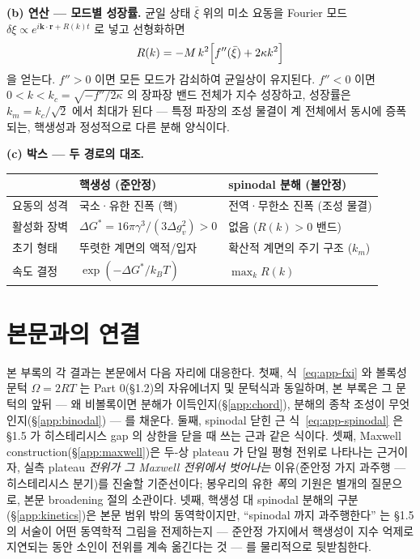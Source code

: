 \documentclass[11pt,a4paper]{article}
\begin{document}
\textbf{(b) 연산 --- 모드별 성장률.} 균일 상태 $\bar\xi$ 위의 미소 요동을 Fourier 모드
$\delta\xi\propto e^{i\mathbf{k}\cdot\mathbf{r}+R(k)t}$ 로 넣고 선형화하면
\begin{equation}
R(k)=-M\,k^2\Bigl[f''(\bar\xi)+2\kappa k^2\Bigr]
\label{eq:app-ch-R}
\end{equation}
을 얻는다. $f''>0$ 이면 모든 모드가 감쇠하여 균일상이 유지된다. $f''<0$ 이면
$0<k<k_c=\sqrt{-f''/2\kappa}$ 의 장파장 밴드 전체가 지수 성장하고, 성장률은
$k_m=k_c/\sqrt2$ 에서 최대가 된다 --- 특정 파장의 조성 물결이 계 전체에서 동시에 증폭되는, 핵생성과
정성적으로 다른 분해 양식이다.

\textbf{(c) 박스 --- 두 경로의 대조.}
\begin{center}
\begin{tabular}{@{}lll@{}}
\toprule
 & 핵생성 (준안정) & spinodal 분해 (불안정) \\
\midrule
요동의 성격 & 국소·유한 진폭 (핵) & 전역·무한소 진폭 (조성 물결) \\
활성화 장벽 & $\Delta G^\ast=16\pi\gamma^3/(3\Delta g_v^2)>0$ & 없음 ($R(k)>0$ 밴드) \\
초기 형태 & 뚜렷한 계면의 액적/입자 & 확산적 계면의 주기 구조 ($k_m$) \\
속도 결정 & $\exp(-\Delta G^\ast/k_BT)$ & $\max_k R(k)$ \\
\bottomrule
\end{tabular}
\end{center}

\section{본문과의 연결}\label{app:link}

본 부록의 각 결과는 본문에서 다음 자리에 대응한다. 첫째, 식~\eqref{eq:app-fxi} 와 볼록성 문턱
$\Omega=2RT$ 는 Part 0(\S1.2)의 자유에너지 및 문턱식과 동일하며, 본 부록은 그 문턱의 앞뒤 ---
왜 비볼록이면 분해가 이득인지(\S\ref{app:chord}), 분해의 종착 조성이 무엇인지(\S\ref{app:binodal})
--- 를 채운다. 둘째, spinodal 닫힌 근 식~\eqref{eq:app-spinodal} 은 \S1.5 가 히스테리시스 gap 의
상한을 닫을 때 쓰는 근과 같은 식이다. 셋째, Maxwell construction(\S\ref{app:maxwell})은 두-상
plateau 가 단일 평형 전위로 나타나는 근거이자, 실측 plateau \emph{전위가 그 Maxwell 전위에서
벗어나는} 이유(준안정 가지 과주행 --- 히스테리시스 분기)를 진술할 기준선이다; 봉우리의 유한
\emph{폭}의 기원은 별개의 질문으로, 본문 broadening 절의 소관이다. 넷째, 핵생성 대 spinodal 분해의 구분(\S\ref{app:kinetics})은 본문
범위 밖의 동역학이지만, ``spinodal 까지 과주행한다'' 는 \S1.5 의 서술이 어떤 동역학적 그림을
전제하는지 --- 준안정 가지에서 핵생성이 지수 억제로 지연되는 동안 소인이 전위를 계속 옮긴다는 것 ---
를 물리적으로 뒷받침한다.
\end{document}
